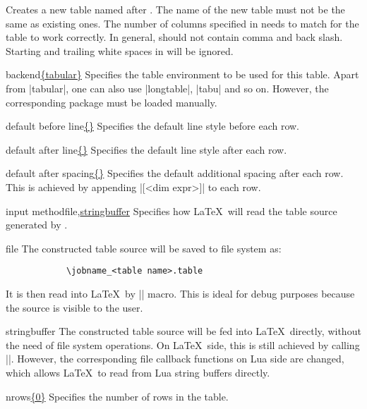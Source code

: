 \documentclass{l3doc}
\newcommand{\thispkg}{\pkg{luaprogtable}}
\newcommand{\optiondf}[1]{\uline{#1}}
\begin{document}
\begin{documentation}
\begin{function}{\LPTNewTable}
    Creates a new table named after . The name of the new table must not be the same as existing ones. The number of columns specified in  needs to match  for the table to work correctly. In general,  should not contain comma and back slash. Starting and trailing white spaces in  will be ignored.

    \begin{optiondetail}{}
        \begin{optionitem}{backend}{\optiondf{\{tabular\}}}
            Specifies the table environment to be used for this table. Apart from |tabular|, one can also use |longtable|, |tabu| and so on. However, the corresponding package must be loaded manually.
        \end{optionitem}
        \begin{optionitem}{default before line}{\optiondf{\{\}}}
            Specifies the default line style before each row.
        \end{optionitem}
        \begin{optionitem}{default after line}{\optiondf{\{\}}}
            Specifies the default line style after each row.
        \end{optionitem}
        \begin{optionitem}{default after spacing}{\optiondf{\{\}}}
            Specifies the default additional spacing after each row. This is achieved by appending |[<dim expr>]| to each row.
        \end{optionitem}
        \begin{optionitem}{input method}{file,\optiondf{stringbuffer}}
            Specifies how \LaTeX\ will read the table source generated by \thispkg.
            \begin{optionlst}
            \item[file] The constructed table source will be saved to file system as:
            \begin{verbatim}
            \jobname_<table name>.table
            \end{verbatim}
            
            It is then read into \LaTeX\ by || macro. This is ideal for debug purposes because the source is visible to the user.
            \item[stringbuffer] The constructed table source will be fed into \LaTeX\  directly, without the need of file system operations. On \LaTeX\ side, this is still achieved by calling ||. However, the corresponding file callback functions on Lua side are changed, which allows \LaTeX\ to read from Lua string buffers directly.
            \end{optionlst}
        \end{optionitem}
        \begin{optionitem}{nrows}{\optiondf{\{0\}}}
            Specifies the number of rows in the table.
        \end{optionitem}
    \end{optiondetail}
    

\end{function}
\end{documentation}
\end{document}
